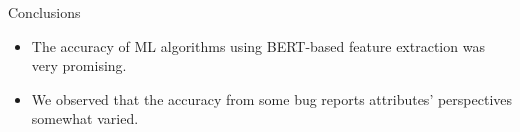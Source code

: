%

\begin{frame}[t,fragile]{Conclusions}
	\begin{itemize}		
		\item The accuracy of ML algorithms using BERT-based feature extraction was \alert{very promising}. 
		\item We observed that the accuracy from some bug reports attributes' perspectives somewhat \alert{varied}.
	\end{itemize}
\end{frame}

